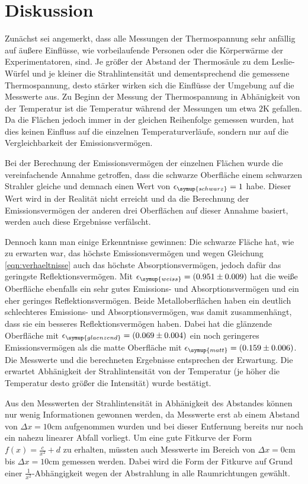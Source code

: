 \section{Diskussion}
\label{sec:Diskussion}
Zunächst sei angemerkt, dass alle Messungen der Thermospannung sehr anfällig auf
äußere Einflüsse, wie vorbeilaufende Personen oder die Körperwärme der Experimentatoren,
sind. Je größer der Abstand der Thermosäule zu dem Leslie-Würfel und je kleiner
die Strahlintensität und dementsprechend die gemessene Thermospannung, desto stärker
wirken sich die Einflüsse der Umgebung auf die Messwerte aus.
Zu Beginn der Messung der Thermospannung in Abhänigkeit von der Temperatur ist
die Temperatur während der Messungen um etwa $2 \si{\kelvin}$ gefallen. Da die Flächen
jedoch immer in der gleichen Reihenfolge gemessen wurden, hat dies keinen Einfluss
auf die einzelnen Temperaturverläufe, sondern nur auf die Vergleichbarkeit der
Emissionsvermögen.

Bei der Berechnung der Emissionsvermögen der einzelnen Flächen wurde die vereinfachende
Annahme getroffen, dass die schwarze Oberfläche einem schwarzen Strahler gleiche
und demnach einen Wert von $\epsilon_\symup{schwarz} = 1$ habe. Dieser Wert wird
in der Realität nicht erreicht und da die Berechnung der Emissionsvermögen der
anderen drei Oberflächen auf dieser Annahme basiert, werden auch diese Ergebnisse
verfälscht.

Dennoch kann man einige Erkenntnisse gewinnen:\newline
Die schwarze Fläche hat, wie zu erwarten war, das höchste Emissionsvermögen und
wegen Gleichung \eqref{eqn:verhaeltnisse} auch das höchste Absorptionsvermögen, jedoch dafür das geringste
Reflektionsvermögen.
Mit $\epsilon_\symup{weiss} = (0.951\pm0.009)$ hat die weiße Oberfläche ebenfalls
ein sehr gutes Emissions- und Absorptionsvermögen und ein eher geringes Reflektionsvermögen.
Beide Metalloberflächen haben ein deutlich schlechteres Emissions- und Absorptionsvermögen,
was damit zusammenhängt, dass sie ein besseres Reflektionsvermögen haben.
Dabei hat die glänzende Oberfläche mit $\epsilon_\symup{glaenzend} = (0.069\pm0.004)$
ein noch geringeres Emissionsvermögen als die matte Oberfläche mit
$\epsilon_\symup{matt} = (0.159\pm0.006)$.
Die Messwerte und die berechneten Ergebnisse entsprechen der Erwartung. Die erwartet
Abhänigkeit der Strahlintensität von der Temperatur (je höher die Temperatur desto
größer die Intensität) wurde bestätigt.

Aus den Messwerten der Strahlintensität in Abhänigkeit des Abstandes können nur
wenig Informationen gewonnen werden, da Messwerte erst ab einem Abstand von
$\Delta x = 10 \si{\centi\meter}$ aufgenommen wurden und bei dieser Entfernung
bereits nur noch ein nahezu linearer Abfall vorliegt. Um eine gute Fitkurve der
Form $f(x) = \frac{c}{x^2} + d $ zu erhalten, müssten auch Messwerte im Bereich
von $\Delta x = 0 \si{\centi\meter}$ bis $\Delta x = 10 \si{\centi\meter}$ gemessen
werden. Dabei wird die Form der Fitkurve auf Grund einer $\frac{1}{x^2}$-Abhängigkeit
wegen der Abstrahlung in alle Raumrichtungen gewählt.
